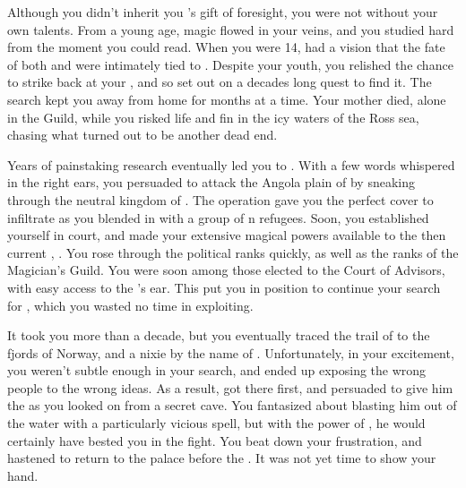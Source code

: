\documentclass[char]{NeptuneBall}
\begin{document}
Although you didn't inherit you \cMother{\parent}'s gift of foresight, you were not without your own talents. From a young age, magic flowed in your veins, and you studied hard from the moment you could read. When you were 14, \cMother{} had a vision that the fate of both \pPacifica{} and \pAtlantis{} were intimately tied to \iTrident{\MYname}. Despite your youth, you relished the chance to strike back at your \cExExKing{\parent}, and so set out on a decades long quest to find it. The search kept you away from home for months at a time. Your mother died, alone in the Guild, while you risked life and fin in the icy waters of the Ross sea, chasing what turned out to be another dead end. 

Years of painstaking research eventually led you to \pAtlantis{}. With a few words whispered in the right ears, you persuaded \pPacifica{} to attack the Angola plain of \pAtlantis{} by sneaking through the neutral kingdom of \pIndia{}. The operation gave you the perfect cover to infiltrate \pAtlantis{} as you blended in with a group of \pAtlantis{}n refugees. Soon, you established yourself in court, and made your extensive magical powers available to the then current \cExKing{\King}, \cExKing{}. You rose through the political ranks quickly, as well as the ranks of the Magician's Guild. You were soon among those elected to the Court of Advisors, with easy access to the \cExKing{\King}'s ear. This put you in position to continue your search for \iTrident{\MYname}, which you wasted no time in exploiting.

It took you more than a decade, but you eventually traced the trail of \iTrident{\MYname} to the fjords of Norway, and a nixie by the name of \cNixie{}. Unfortunately, in your excitement, you weren't subtle enough in your search, and ended up exposing the wrong people to the wrong ideas. As a result, \cExKing{} got there first, and persuaded \cNixie{} to give him the \iTrident{\MYname} as you looked on from a secret cave. You fantasized about blasting him out of the water with a particularly vicious spell, but with the power of \iTrident{\MYname}, he would certainly have bested you in the fight. You beat down your frustration, and hastened to return to the palace before the \cExKing{\King}. It was not yet time to show your hand.
\end{document}
